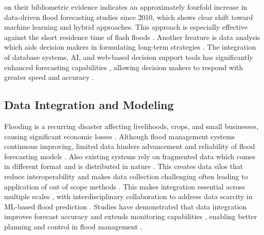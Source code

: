 \documentclass{research}
\begin{document}
\cite{davary2026} on their bibliometric evidence indicates an 
approximately fourfold increase in data-driven flood forecasting studies 
since 2010, which shows clear shift toward machine learning and hybrid 
approaches. This approach is especially effective against 
the short residence time of flash floods \cite{alrawas2024critical}. 
Another freature is data analysis which aids decision makers in formulating long-term strategies 
\cite{H_Warni_Angriawan_Hariadi_Arif_Maulina_2024} \cite{11209450}. 
The integration of database systems, AI, and web-based decision support 
tools has significantly enhanced forecasting capabilities 
\cite{Rashid_Abidin_Abas_2024}, allowing decision makers to respond 
with greater speed and accuracy \cite{Wang_Wu_Yichen_2025}.

\subsection*{Data Integration and Modeling}

Flooding is a recurring disaster affecting livelihoods, crops, and small businesses, causing 
significant economic losses \cite{Istihat_Widyarto_Ahmad}. Although flood management systems
continuous improving, limited data hinders advancement and reliability of flood forecasting models\cite{TEDLA2024131076} \cite{Fang_Johnson_Sankarasubramanian_2024} \cite{Quang_Van_Thanh_2025}. 
Also existing systems rely on fragmented data  which comes in different format and is 
distributed in nature \cite{smartcities8030091} \cite{w14142160}. 
This creates data silos that reduce interoperability and makes data collection challenging \cite{H_Rao_Rao_J_Rao_Rao_2023}
often leading to application of out of scope methods \cite{nazari2026}. This makes integration 
essential across multiple scales \cite{cli12050067}, with interdisciplinary collaboration 
to address data scarcity in ML-based flood prediction \cite{byaruhanga2024evolution}. Studies 
have demonstrated that data integration improves forecast accuracy and extends 
monitoring capabilities \cite{Wang_Abdelrahman_2023}, enabling better planning and control
in flood management \cite{Sengupta_2024}. 
\end{document}
